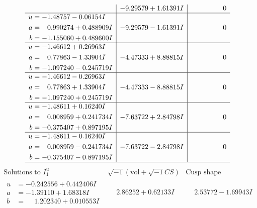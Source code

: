 \documentclass[1p]{elsarticle_modified}
\theoremstyle{definition}
\newcommand{\I}{\sqrt{-1}}
\begin{document}
$$\begin{array}{c|c|c}
 & -9.29579 + 1.61391 I & \phantom{-0.000000 } 0 \\ \hline\begin{aligned}
u &= -1.48757 - 0.06154 I \\
a &= \phantom{-}0.990274 + 0.488909 I \\
b &= -1.155060 + 0.489600 I\end{aligned}
 & -9.29579 - 1.61391 I & \phantom{-0.000000 } 0 \\ \hline\begin{aligned}
u &= -1.46612 + 0.26963 I \\
a &= \phantom{-}0.77863 - 1.33904 I \\
b &= -1.097240 - 0.245719 I\end{aligned}
 & -4.47333 + 8.88815 I & \phantom{-0.000000 } 0 \\ \hline\begin{aligned}
u &= -1.46612 - 0.26963 I \\
a &= \phantom{-}0.77863 + 1.33904 I \\
b &= -1.097240 + 0.245719 I\end{aligned}
 & -4.47333 - 8.88815 I & \phantom{-0.000000 } 0 \\ \hline\begin{aligned}
u &= -1.48611 + 0.16240 I \\
a &= \phantom{-}0.008959 + 0.241734 I \\
b &= -0.375407 + 0.897195 I\end{aligned}
 & -7.63722 + 2.84798 I & \phantom{-0.000000 } 0 \\ \hline\begin{aligned}
u &= -1.48611 - 0.16240 I \\
a &= \phantom{-}0.008959 - 0.241734 I \\
b &= -0.375407 - 0.897195 I\end{aligned}
 & -7.63722 - 2.84798 I & \phantom{-0.000000 } 0\\
 \hline 
 \end{array}$$\newpage$$\begin{array}{c|c|c}  
\text{Solutions to }I^u_{1}& \I (\text{vol} + \sqrt{-1}CS) & \text{Cusp shape}\\
 \hline 
\begin{aligned}
u &= -0.242556 + 0.442406 I \\
a &= -1.39110 + 1.68318 I \\
b &= \phantom{-}1.202340 + 0.010553 I\end{aligned}
 & \phantom{-}2.86252 + 0.62133 I & \phantom{-}2.53772 - 1.69943 I \\ \hline\begin{aligned}

\end{aligned}
\end{array}$$
\end{document}

